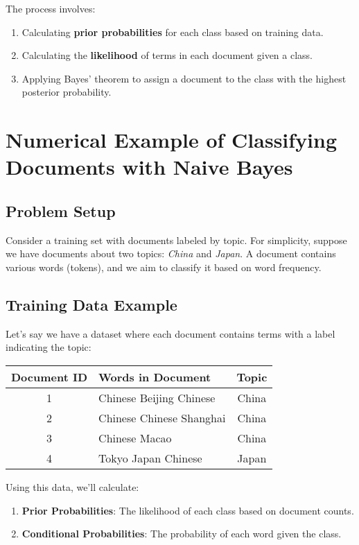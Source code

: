 \documentclass{article}
\begin{document}
The process involves:
\begin{enumerate}
    \item Calculating \textbf{prior probabilities} for each class based on training data.
    \item Calculating the \textbf{likelihood} of terms in each document given a class.
    \item Applying Bayes’ theorem to assign a document to the class with the highest posterior probability.
\end{enumerate}

\section*{Numerical Example of Classifying Documents with Naive Bayes}

\subsection*{Problem Setup}
Consider a training set with documents labeled by topic. For simplicity, suppose we have documents about two topics: \textit{China} and \textit{Japan}. A document contains various words (tokens), and we aim to classify it based on word frequency.

\subsection*{Training Data Example}
Let's say we have a dataset where each document contains terms with a label indicating the topic:

\begin{center}
\begin{tabular}{|c|l|c|}
\hline
Document ID & Words in Document & Topic \\
\hline
1 & Chinese Beijing Chinese & China \\
2 & Chinese Chinese Shanghai & China \\
3 & Chinese Macao & China \\
4 & Tokyo Japan Chinese & Japan \\
\hline
\end{tabular}
\end{center}

Using this data, we’ll calculate:
\begin{enumerate}
    \item \textbf{Prior Probabilities}: The likelihood of each class based on document counts.
    \item \textbf{Conditional Probabilities}: The probability of each word given the class.
\end{enumerate}
\end{document}
